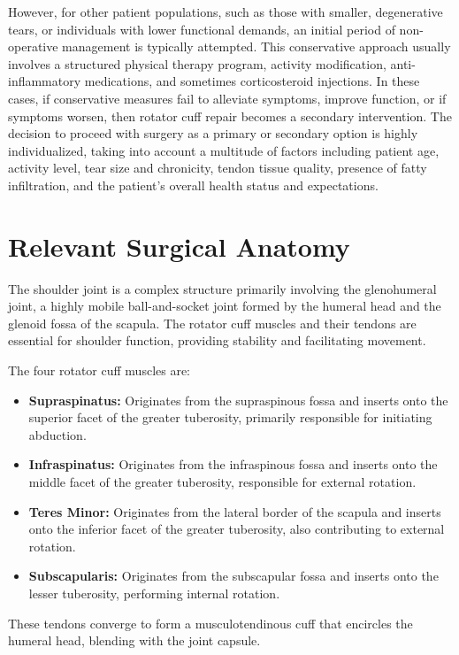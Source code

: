 However, for other patient populations, such as those with smaller, degenerative tears, or individuals with lower functional demands, an initial period of non-operative management is typically attempted. This conservative approach usually involves a structured physical therapy program, activity modification, anti-inflammatory medications, and sometimes corticosteroid injections. In these cases, if conservative measures fail to alleviate symptoms, improve function, or if symptoms worsen, then rotator cuff repair becomes a secondary intervention. The decision to proceed with surgery as a primary or secondary option is highly individualized, taking into account a multitude of factors including patient age, activity level, tear size and chronicity, tendon tissue quality, presence of fatty infiltration, and the patient's overall health status and expectations.

\section*{Relevant Surgical Anatomy}
The shoulder joint is a complex structure primarily involving the glenohumeral joint, a highly mobile ball-and-socket joint formed by the humeral head and the glenoid fossa of the scapula. The rotator cuff muscles and their tendons are essential for shoulder function, providing stability and facilitating movement. 

The four rotator cuff muscles are:

\begin{itemize}
  \item \textbf{Supraspinatus:} Originates from the supraspinous fossa and inserts onto the superior facet of the greater tuberosity, primarily responsible for initiating abduction.
  \item \textbf{Infraspinatus:} Originates from the infraspinous fossa and inserts onto the middle facet of the greater tuberosity, responsible for external rotation.
  \item \textbf{Teres Minor:} Originates from the lateral border of the scapula and inserts onto the inferior facet of the greater tuberosity, also contributing to external rotation.
  \item \textbf{Subscapularis:} Originates from the subscapular fossa and inserts onto the lesser tuberosity, performing internal rotation.
\end{itemize}

These tendons converge to form a musculotendinous cuff that encircles the humeral head, blending with the joint capsule. 

